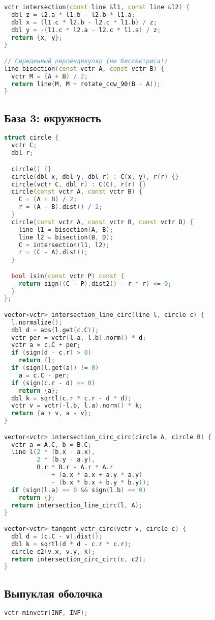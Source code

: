 \documentclass[9pt,a4paper,landscape,twosided]{extarticle}
\begin{document}
\begin{multicols*}{3}
\begin{lstlisting}[language=C++]
vctr intersection(const line &l1, const line &l2) {
  dbl z = l2.a * l1.b - l2.b * l1.a;
  dbl x = (l1.c * l2.b - l2.c * l1.b) / z;
  dbl y = -(l1.c * l2.a - l2.c * l1.a) / z;
  return {x, y};
}

// Серединный перпендикуляр (не биссектриса!)
line bisection(const vctr A, const vctr B) {
  vctr M = (A + B) / 2;
  return line(M, M + rotate_ccw_90(B - A));
}

\end{lstlisting}

\subsection{База 3: окружность}
\begin{lstlisting}[language=C++]
struct circle {
  vctr C;
  dbl r;

  circle() {}
  circle(dbl x, dbl y, dbl r) : C(x, y), r(r) {}
  circle(vctr C, dbl r) : C(C), r(r) {}
  circle(const vctr A, const vctr B) {
    C = (A + B) / 2;
    r = (A - B).dist() / 2;
  }
  circle(const vctr A, const vctr B, const vctr D) {
    line l1 = bisection(A, B);
    line l2 = bisection(B, D);
    C = intersection(l1, l2);
    r = (C - A).dist();
  }

  bool isin(const vctr P) const {
    return sign((C - P).dist2() - r * r) <= 0;
  }
};

vector<vctr> intersection_line_circ(line l, circle c) {
  l.normalize();
  dbl d = abs(l.get(c.C));
  vctr per = vctr(l.a, l.b).norm() * d;
  vctr a = c.C + per;
  if (sign(d - c.r) > 0)
    return {};
  if (sign(l.get(a)) != 0)
    a = c.C - per;
  if (sign(c.r - d) == 0)
    return {a};
  dbl k = sqrtl(c.r * c.r - d * d);
  vctr v = vctr(-l.b, l.a).norm() * k;
  return {a + v, a - v};
}

vector<vctr> intersection_circ_circ(circle A, circle B) {
  vctr a = A.C, b = B.C;
  line l(2 * (b.x - a.x),
         2 * (b.y - a.y),
         B.r * B.r - A.r * A.r
             + (a.x * a.x + a.y * a.y)
             - (b.x * b.x + b.y * b.y));
  if (sign(l.a) == 0 && sign(l.b) == 0)
    return {};
  return intersection_line_circ(l, A);
}

vector<vctr> tangent_vctr_circ(vctr v, circle c) {
  dbl d = (c.C - v).dist();
  dbl k = sqrtl(d * d - c.r * c.r);
  circle c2(v.x, v.y, k);
  return intersection_circ_circ(c, c2);
}

\end{lstlisting}

\subsection{Выпуклая оболочка}
\begin{lstlisting}[language=C++]
vctr minvctr(INF, INF);


\end{lstlisting}
\end{multicols*}
\end{document}
